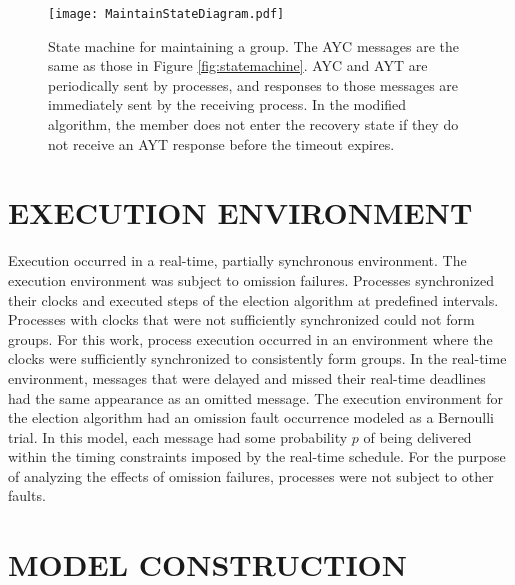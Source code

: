 \begin{figure}[htbp]
\texttt{[image: MaintainStateDiagram.pdf]}
\caption[State machine for maintaining a group.]{State machine for maintaining a group. The \ac{AYC} messages are the same as those in Figure \ref{fig:statemachine}. \ac{AYC} and \ac{AYT} are periodically sent by processes, and responses to those messages are immediately sent by the receiving process. In the modified algorithm, the member does not enter the recovery state if they do not receive an AYT response before the timeout expires.}
\label{fig:statemachine2}
\end{figure}

\section{EXECUTION ENVIRONMENT}

Execution occurred in a real-time, partially synchronous environment.
The execution environment was subject to omission failures.
Processes synchronized their clocks and executed steps of the election algorithm at predefined intervals.
Processes with clocks that were not sufficiently synchronized could not form groups.
For this work, process execution occurred in an environment where the clocks were sufficiently synchronized to consistently form groups.
In the real-time environment, messages that were delayed and missed their real-time deadlines had the same appearance as an omitted message.
The execution environment for the election algorithm had an omission fault occurrence modeled as a Bernoulli trial.
In this model, each message had some probability $p$ of being delivered within the timing constraints imposed by the real-time schedule.
For the purpose of analyzing the effects of omission failures, processes were not subject to other faults.

\section{MODEL CONSTRUCTION}

